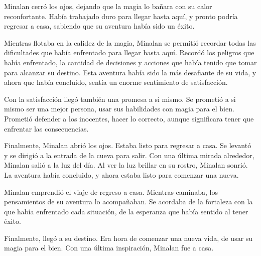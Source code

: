 
Minalan cerró los ojos, dejando que la magia lo bañara con su calor reconfortante. Había trabajado duro para llegar hasta aquí, y pronto podría regresar a casa, sabiendo que su aventura había sido un éxito.

Mientras flotaba en la calidez de la magia, Minalan se permitió recordar todas las dificultades que había enfrentado para llegar hasta aquí. Recordó los peligros que había enfrentado, la cantidad de decisiones y acciones que había tenido que tomar para alcanzar su destino. Esta aventura había sido la más desafiante de su vida, y ahora que había concluido, sentía un enorme sentimiento de satisfacción.

Con la satisfacción llegó también una promesa a si mismo. Se prometió a si mismo ser una mejor persona, usar sus habilidades con magia para el bien. Prometió defender a los inocentes, hacer lo correcto, aunque significara tener que enfrentar las consecuencias.

Finalmente, Minalan abrió los ojos. Estaba listo para regresar a casa. Se levantó y se dirigió a la entrada de la cueva para salir. Con una última mirada alrededor, Minalan salió a la luz del día. Al ver la luz brillar en su rostro, Minalan sonrió. La aventura había concluido, y ahora estaba listo para comenzar una nueva.

Minalan emprendió el viaje de regreso a casa. Mientras caminaba, los pensamientos de su aventura lo acompañaban. Se acordaba de la fortaleza con la que había enfrentado cada situación, de la esperanza que había sentido al tener éxito.

Finalmente, llegó a su destino. Era hora de comenzar una nueva vida, de usar su magia para el bien. Con una última inspiración, Minalan fue a casa.